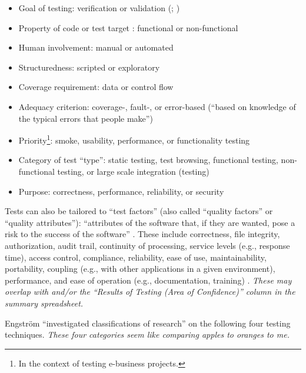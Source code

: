 \begin{itemize}
            \citealp[p.~53]{Patton2006})
      \item Goal of testing: verification or validation
            (\citealp[p.~214]{KuļešovsEtAl2013}; \citealp[pp.~69-70]{Perry2006})
      \item Property of code \citep[p.~213]{KuļešovsEtAl2013} or test target
            \citep[pp.~4-5]{Kam2008}: functional or non-functional
      \item Human involvement: manual or automated
            \citep[p.~214]{KuļešovsEtAl2013}
      \item Structuredness: scripted or exploratory
            \citep[p.~214]{KuļešovsEtAl2013}
      \item Coverage requirement: data or control flow \citep[pp.~4-5]{Kam2008}
      \item Adequacy criterion: coverage-, fault-, or error-based
            (``based on knowledge of the typical errors that people make'')
            \citep[pp.~398-399]{vanVliet2000}
      \item Priority\footnote{In the context of testing e-business projects.}:
            smoke, usability, performance, or functionality testing
            \citep[p.~12]{Gerrard2000a}
      \item Category of test ``type'': static testing,
            test browsing, functional testing, non-functional testing, or large
            scale integration (testing) \citep[p.~12]{Gerrard2000a}
      \item Purpose: correctness, performance, reliability, or security
            \citep{Pan1999}
\end{itemize}

Tests can also be tailored to ``test factors'' (also called ``quality factors''
or ``quality attributes''): ``attributes of the software that, if they are
wanted, pose a risk to the success of the software''
\citep[p.~40]{Perry2006}. These include correctness, file integrity,
authorization, audit trail, continuity of processing, service levels
(e.g., response time), access control, compliance, reliability, ease of use,
maintainability, portability, coupling (e.g., with other applications in a
given environment), performance, and ease of operation (e.g., documentation,
training) \citep[pp.~40-41]{Perry2006}. \emph{These may overlap with
       and/or
      the ``Results of Testing (Area of Confidence)'' column in the summary
      spreadsheet.}

Engström ``investigated classifications of research''
\citep[p.~1]{engström_mapping_2015} on the following four testing techniques.
\emph{These four categories seem like comparing apples to oranges to me.}

